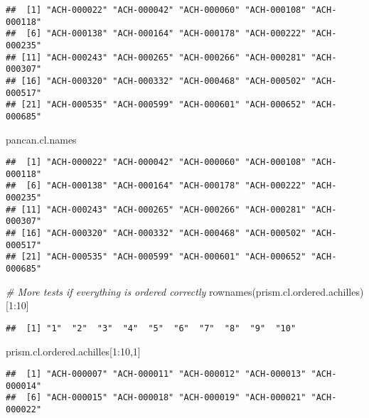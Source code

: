 \documentclass[
]{article}
\newenvironment{Shaded}{\begin{snugshade}}{\end{snugshade}}
\newcommand{\CommentTok}[1]{\textcolor[rgb]{0.56,0.35,0.01}{\textit{#1}}}
\newcommand{\DecValTok}[1]{\textcolor[rgb]{0.00,0.00,0.81}{#1}}
\newcommand{\FunctionTok}[1]{\textcolor[rgb]{0.00,0.00,0.00}{#1}}
\newcommand{\NormalTok}[1]{#1}
\newcommand{\SpecialCharTok}[1]{\textcolor[rgb]{0.00,0.00,0.00}{#1}}
\begin{document}
\begin{verbatim}
##  [1] "ACH-000022" "ACH-000042" "ACH-000060" "ACH-000108" "ACH-000118"
##  [6] "ACH-000138" "ACH-000164" "ACH-000178" "ACH-000222" "ACH-000235"
## [11] "ACH-000243" "ACH-000265" "ACH-000266" "ACH-000281" "ACH-000307"
## [16] "ACH-000320" "ACH-000332" "ACH-000468" "ACH-000502" "ACH-000517"
## [21] "ACH-000535" "ACH-000599" "ACH-000601" "ACH-000652" "ACH-000685"
\end{verbatim}

\begin{Shaded}
\begin{Highlighting}[]
\NormalTok{pancan.cl.names}
\end{Highlighting}
\end{Shaded}

\begin{verbatim}
##  [1] "ACH-000022" "ACH-000042" "ACH-000060" "ACH-000108" "ACH-000118"
##  [6] "ACH-000138" "ACH-000164" "ACH-000178" "ACH-000222" "ACH-000235"
## [11] "ACH-000243" "ACH-000265" "ACH-000266" "ACH-000281" "ACH-000307"
## [16] "ACH-000320" "ACH-000332" "ACH-000468" "ACH-000502" "ACH-000517"
## [21] "ACH-000535" "ACH-000599" "ACH-000601" "ACH-000652" "ACH-000685"
\end{verbatim}

\begin{Shaded}
\begin{Highlighting}[]
\CommentTok{\# More tests if everything is ordered correctly}
\FunctionTok{rownames}\NormalTok{(prism.cl.ordered.achilles)[}\DecValTok{1}\SpecialCharTok{:}\DecValTok{10}\NormalTok{]}
\end{Highlighting}
\end{Shaded}

\begin{verbatim}
##  [1] "1"  "2"  "3"  "4"  "5"  "6"  "7"  "8"  "9"  "10"
\end{verbatim}

\begin{Shaded}
\begin{Highlighting}[]
\NormalTok{prism.cl.ordered.achilles[}\DecValTok{1}\SpecialCharTok{:}\DecValTok{10}\NormalTok{,}\DecValTok{1}\NormalTok{]}
\end{Highlighting}
\end{Shaded}

\begin{verbatim}
##  [1] "ACH-000007" "ACH-000011" "ACH-000012" "ACH-000013" "ACH-000014"
##  [6] "ACH-000015" "ACH-000018" "ACH-000019" "ACH-000021" "ACH-000022"
\end{verbatim}
\end{document}
